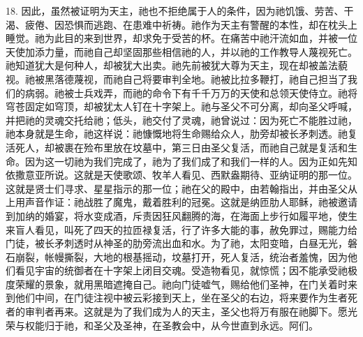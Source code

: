 18. 因此，虽然被证明为天主，祂也不拒绝属于人的条件，因为祂饥饿、劳苦、干渴、疲倦、因恐惧而逃跑、在患难中祈祷。祂作为天主有警醒的本性，却在枕头上睡觉。祂为此目的来到世界，却求免于受苦的杯。在痛苦中祂汗流如血，并被一位天使加添力量，而祂自己却坚固那些相信祂的人，并以祂的工作教导人蔑视死亡。祂知道犹大是何种人，却被犹大出卖。祂先前被犹大尊为天主，现在却被盖法藐视。祂被黑落德蔑视，而祂自己将要审判全地。祂被比拉多鞭打，祂自己担当了我们的病弱。祂被士兵戏弄，而祂的命令下有千千万万的天使和总领天使侍立。祂将穹苍固定如穹顶，却被犹太人钉在十字架上。祂与圣父不可分离，却向圣父呼喊，并把祂的灵魂交托给祂；低头，祂交付了灵魂，祂曾说过：因为死亡不能胜过祂，祂本身就是生命，祂这样说：祂慷慨地将生命赐给众人，肋旁却被长矛刺透。祂复活死人，却被裹在殓布里放在坟墓中，第三日由圣父复活，而祂自己就是复活和生命。因为这一切祂为我们完成了，祂为了我们成了和我们一样的人。因为正如先知依撒意亚所说。这就是天使歌颂、牧羊人看见、西默盎期待、亚纳证明的那一位。这就是贤士们寻求、星星指示的那一位；祂在父的殿中，由若翰指出，并由圣父从上用声音作证：祂战胜了魔鬼，戴着胜利的冠冕。这就是纳匝肋人耶稣，祂被邀请到加纳的婚宴，将水变成酒，斥责因狂风翻腾的海，在海面上步行如履平地，使生来盲人看见，叫死了四天的拉匝禄复活，行了许多大能的事，赦免罪过，赐能力给门徒，被长矛刺透时从神圣的肋旁流出血和水。为了祂，太阳变暗，白昼无光，磐石崩裂，帐幔撕裂，大地的根基摇动，坟墓打开，死人复活，统治者羞愧，因为他们看见宇宙的统御者在十字架上闭目交魂。受造物看见，就惊慌；因不能承受祂极度荣耀的景象，就用黑暗遮掩自己。祂向门徒嘘气，赐给他们圣神，在门关着时来到他们中间，在门徒注视中被云彩接到天上，坐在圣父的右边，将来要作为生者死者的审判者再来。这就是为了我们成为人的天主，圣父也将万有服在祂脚下。愿光荣与权能归于祂，和圣父及圣神，在圣教会中，从今世直到永远。阿们。\par

